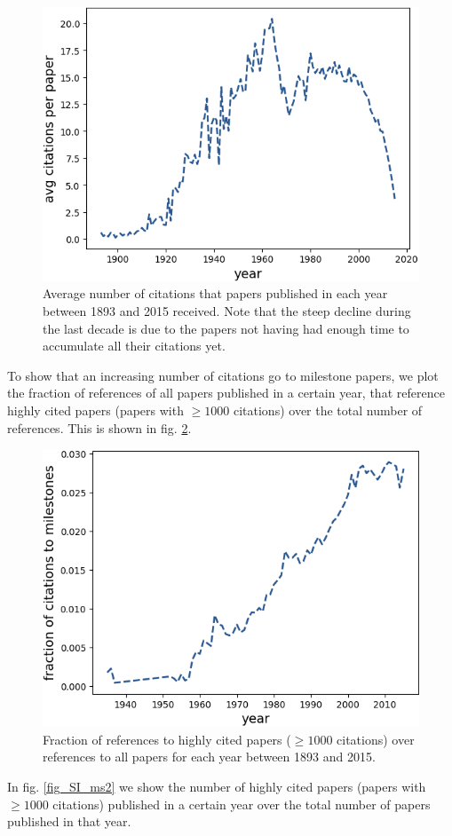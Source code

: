 \documentclass[fleqn,10pt]{wlscirep}
\begin{document}
\begin{figure}[H]
	\centering
	 \includegraphics[width=0.7\columnwidth]{8.png}
	\caption{
	Average number of citations that papers published in each year between 1893 and 2015 received. Note that the steep decline during the last decade is due to the papers not having had enough time to accumulate all their citations yet.
	}
	\label{fig_SI_cit}
\end{figure}

To show that an increasing number of citations go to milestone papers, we plot the fraction of references of all papers published in a certain year, that reference highly cited papers (papers with $\geq 1000$ citations) over the total number of references. This is shown in fig. \ref{fig_SI_ms1}.  

\begin{figure}[H]
	\centering
	 \includegraphics[width=0.7\columnwidth]{9.png}
	\caption{
	    Fraction of references to highly cited papers ($\geq 1000$ citations) over references to all papers for each year between 1893 and 2015.
	}
	\label{fig_SI_ms1}
\end{figure}

In fig. \ref{fig_SI_ms2} we show the number of highly cited papers (papers with $\geq 1000$ citations) published in a certain year over the total number of papers published in that year.
\end{document}
